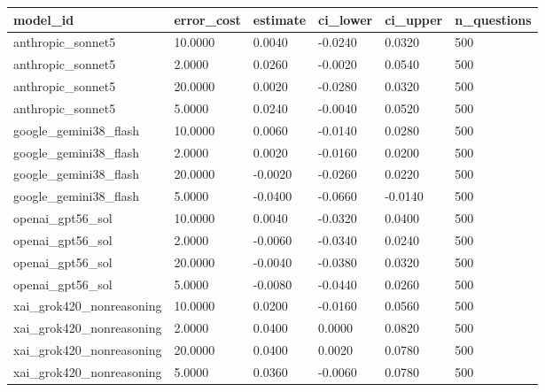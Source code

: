 \begin{tabular}{llllll}
\toprule
model\_id & error\_cost & estimate & ci\_lower & ci\_upper & n\_questions \\
\midrule
anthropic\_sonnet5 & 10.0000 & 0.0040 & -0.0240 & 0.0320 & 500 \\
anthropic\_sonnet5 & 2.0000 & 0.0260 & -0.0020 & 0.0540 & 500 \\
anthropic\_sonnet5 & 20.0000 & 0.0020 & -0.0280 & 0.0320 & 500 \\
anthropic\_sonnet5 & 5.0000 & 0.0240 & -0.0040 & 0.0520 & 500 \\
google\_gemini38\_flash & 10.0000 & 0.0060 & -0.0140 & 0.0280 & 500 \\
google\_gemini38\_flash & 2.0000 & 0.0020 & -0.0160 & 0.0200 & 500 \\
google\_gemini38\_flash & 20.0000 & -0.0020 & -0.0260 & 0.0220 & 500 \\
google\_gemini38\_flash & 5.0000 & -0.0400 & -0.0660 & -0.0140 & 500 \\
openai\_gpt56\_sol & 10.0000 & 0.0040 & -0.0320 & 0.0400 & 500 \\
openai\_gpt56\_sol & 2.0000 & -0.0060 & -0.0340 & 0.0240 & 500 \\
openai\_gpt56\_sol & 20.0000 & -0.0040 & -0.0380 & 0.0320 & 500 \\
openai\_gpt56\_sol & 5.0000 & -0.0080 & -0.0440 & 0.0260 & 500 \\
xai\_grok420\_nonreasoning & 10.0000 & 0.0200 & -0.0160 & 0.0560 & 500 \\
xai\_grok420\_nonreasoning & 2.0000 & 0.0400 & 0.0000 & 0.0820 & 500 \\
xai\_grok420\_nonreasoning & 20.0000 & 0.0400 & 0.0020 & 0.0780 & 500 \\
xai\_grok420\_nonreasoning & 5.0000 & 0.0360 & -0.0060 & 0.0780 & 500 \\
\bottomrule
\end{tabular}
